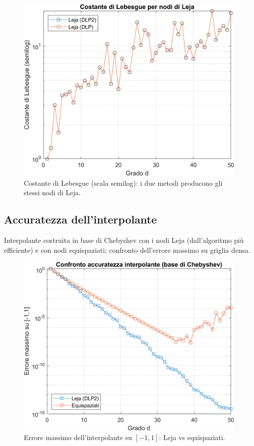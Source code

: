 \documentclass[12pt]{article}
\begin{document}
\begin{figure}[htbp!]
  \centering
  \includegraphics[width=.9\textwidth]{lebesgue.png}
  \caption{Costante di Lebesgue (scala semilog): i due metodi producono gli stessi nodi di Leja.}
\end{figure}

\clearpage
\subsection{Accuratezza dell'interpolante}
Interpolante costruita in base di Chebyshev con i nodi Leja (dall'algoritmo più efficiente) e con nodi equispaziati; confronto dell'errore massimo su griglia densa.
\begin{figure}[htbp!]
  \centering
  \includegraphics[width=.9\textwidth]{errori.png}
  \caption{Errore massimo dell'interpolante su \([{-}1,1]\): Leja vs equispaziati.}
\end{figure}
\end{document}
